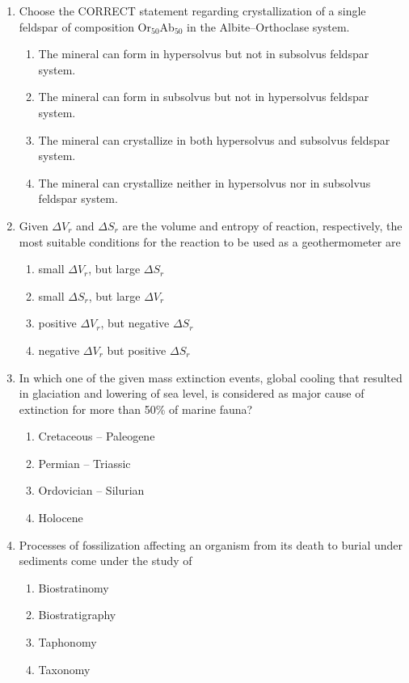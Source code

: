 \documentclass[journal,12pt,onecolumn]{IEEEtran}
\theoremstyle{remark}
\begin{document}
\begin{enumerate}
\item \parbox[t]{\linewidth}{Choose the CORRECT statement regarding crystallization of a single feldspar of composition Or$_{50}$Ab$_{50}$ in the Albite--Orthoclase system.}
\begin{enumerate}
\item The mineral can form in hypersolvus but not in subsolvus feldspar system.
\item The mineral can form in subsolvus but not in hypersolvus feldspar system.
\item The mineral can crystallize in both hypersolvus and subsolvus feldspar system.
\item The mineral can crystallize neither in hypersolvus nor in subsolvus feldspar system.
\end{enumerate}
\vspace{0.5cm}

\item Given $\Delta V_r$ and $\Delta S_r$ are the volume and entropy of reaction, respectively, the most suitable conditions for the reaction to be used as a geothermometer are
\begin{enumerate}
\item small $\Delta V_r$, but large $\Delta S_r$
\item small $\Delta S_r$, but large $\Delta V_r$
\item positive $\Delta V_r$, but negative $\Delta S_r$
\item negative $\Delta V_r$ but positive $\Delta S_r$
\end{enumerate}
\vspace{0.5cm}

\item In which one of the given mass extinction events, global cooling that resulted in glaciation and lowering of sea level, is considered as major cause of extinction for more than 50\% of marine fauna?
\begin{enumerate}
\item Cretaceous -- Paleogene
\item Permian -- Triassic
\item Ordovician -- Silurian
\item Holocene
\end{enumerate}
\vspace{0.5cm}

\item Processes of fossilization affecting an organism from its death to burial under sediments come under the study of
\begin{enumerate}
\item Biostratinomy
\item Biostratigraphy
\item Taphonomy
\item Taxonomy
\end{enumerate}
\vspace{0.5cm}


\end{enumerate}
\end{document}
